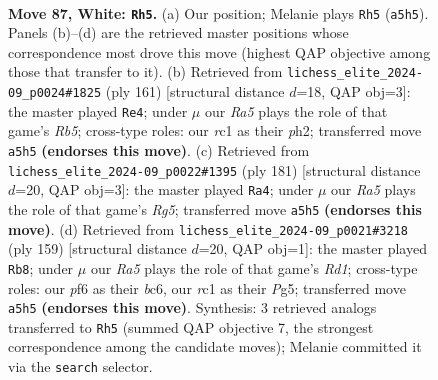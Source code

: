 \documentclass[11pt]{article}
\begin{document}
\clearpage

\begin{figure}[p]\centering
\begin{subfigure}{0.46\textwidth}\centering
\resizebox{\linewidth}{!}{%
\newchessgame
\chessboard[
  setfen={8/6k1/4pp2/R7/P3P3/5P1K/1R6/2r5 w - - 0 87},
  showmover=false,
  pgfstyle=straightmove, color=movearrow, markmove={a5-h5}
]}
\caption{}
\end{subfigure}\hfill
\begin{subfigure}{0.46\textwidth}\centering
\resizebox{\linewidth}{!}{%
\newchessgame
\chessboard[
  setfen={8/3R4/8/1p3kp1/1r6/7P/2K4P/8 b - - 5 81},
  showmover=false,
  pgfstyle=straightmove, color=movearrow, markmove={b4-e4}
]}
\caption{}
\end{subfigure}
\\[4pt]
\begin{subfigure}{0.46\textwidth}\centering
\resizebox{\linewidth}{!}{%
\newchessgame
\chessboard[
  setfen={8/4k1p1/1R5p/3KP2P/6r1/8/8/8 b - - 1 91},
  showmover=false,
  pgfstyle=straightmove, color=movearrow, markmove={g4-a4}
]}
\caption{}
\end{subfigure}\hfill
\begin{subfigure}{0.46\textwidth}\centering
\resizebox{\linewidth}{!}{%
\newchessgame
\chessboard[
  setfen={3r4/6k1/2B2p2/2K2Pp1/6P1/R7/8/8 b - - 4 80},
  showmover=false,
  pgfstyle=straightmove, color=movearrow, markmove={d8-b8}
]}
\caption{}
\end{subfigure}
\caption{\textbf{Move 87, White: \texttt{Rh5}.} (a) Our position; Melanie plays \texttt{Rh5} (\texttt{a5h5}). Panels (b)--(d) are the retrieved master positions whose correspondence most drove this move (highest QAP objective among those that transfer to it). (b) Retrieved from \texttt{lichess\_elite\_2024-09\_p0024\#1825} (ply 161) [structural distance $d$=18, QAP obj=3]: the master played \texttt{Re4}; under $\mu$ our \emph{Ra5} plays the role of that game's \emph{Rb5}; cross-type roles: our \emph{r}c1 as their \emph{p}h2; transferred move \texttt{a5h5} \textbf{(endorses this move)}. (c) Retrieved from \texttt{lichess\_elite\_2024-09\_p0022\#1395} (ply 181) [structural distance $d$=20, QAP obj=3]: the master played \texttt{Ra4}; under $\mu$ our \emph{Ra5} plays the role of that game's \emph{Rg5}; transferred move \texttt{a5h5} \textbf{(endorses this move)}. (d) Retrieved from \texttt{lichess\_elite\_2024-09\_p0021\#3218} (ply 159) [structural distance $d$=20, QAP obj=1]: the master played \texttt{Rb8}; under $\mu$ our \emph{Ra5} plays the role of that game's \emph{Rd1}; cross-type roles: our \emph{p}f6 as their \emph{b}c6, our \emph{r}c1 as their \emph{P}g5; transferred move \texttt{a5h5} \textbf{(endorses this move)}. Synthesis: 3 retrieved analogs transferred to \texttt{Rh5} (summed QAP objective 7, the strongest correspondence among the candidate moves); Melanie committed it via the \texttt{search} selector.}
\label{fig:thought-m172}
\end{figure}
\end{document}
